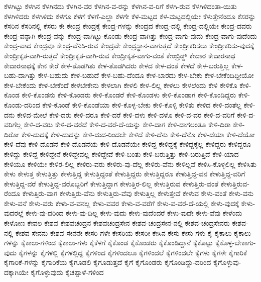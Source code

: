 {ಕೆಳಗಿಟ್ಟು
ಕೆಳಗಿನ
ಕೆಳಗಿನದು
ಕೆಳಗಿನ-ವರ
ಕೆಳಗಿನ-ವ-ರನ್ನು
ಕೆಳಗಿನ-ವ-ರಿಗೆ
ಕೆಳಗಿ-ರುವ
ಕೆಳಗಿಳಿದಂತಾ-ಯಿತು
ಕೆಳಗಿಳಿದರು
ಕೆಳಗಿಳಿದು
ಕೆಳಗೂ
ಕೆಳಗೆ
ಕೆಳಗೆ-ಎಲ್ಲಾ
ಕೆಳಗೇ
ಕೆಳ-ಮಟ್ಟದ
ಕೆಳ-ಮಟ್ಟದಲ್ಲಿಯೇ
ಕೆಳುತ್ತೇನೆಂದೂ
ಕೆಸರನ್ನು
ಕೆಸರಿನ
ಕೆಸರಿನಲ್ಲಿ
ಕೆಸರು
ಕೇ
ಕೇಂದ್ರ
ಕೇಂದ್ರಕ್ಕೆ
ಕೇಂದ್ರ-ಗಳನ್ನು
ಕೇಂದ್ರದ
ಕೇಂದ್ರ-ದಲ್ಲಿ
ಕೇಂದ್ರ-ದಲ್ಲಿಯೇ
ಕೇಂದ್ರ-ದವರು
ಕೇಂದ್ರ-ವನ್ನಾಗಿ
ಕೇಂದ್ರ-ವನ್ನು
ಕೇಂದ್ರ-ವಾಗಿಟ್ಟು-ಕೊಂಡು
ಕೇಂದ್ರ-ವಾಗಿತ್ತು
ಕೇಂದ್ರ-ವಾಗು-ವುದು
ಕೇಂದ್ರ-ವಾಗು-ವುದೆಂದು
ಕೇಂದ್ರ-ವಾದ
ಕೇಂದ್ರವೂ
ಕೇಂದ್ರ-ವೆನಿಸಿ-ರುವ
ಕೇಂದ್ರವೇ
ಕೇಂದ್ರಸ್ಥಾನ-ವಾಗುತ್ತದೆ
ಕೇಂದ್ರೀಕರಿಸಲು
ಕೇಂದ್ರೀಕರಿಸು-ವುದಕ್ಕೆ
ಕೇಂದ್ರೀಕೃತ-ವಾಗಿ-ರುತ್ತದೆ
ಕೇಂದ್ರೀಕೃತ-ವಾಗಿ-ರುವ
ಕೇಂದ್ರೀಕೃತ-ವಾಗು-ವಂತೆ
ಕೇಂಬ್ರಿಡ್ಜ್
ಕೇದಾರ
ಕೇದಾರನಾಥ
ಕೇದಾರನಾಥಕ್ಕೆ
ಕೇನ
ಕೇರೆ
ಕೇಳ-ತೊಡಗಿತು
ಕೇಳ-ತೊಡಗಿದರು
ಕೇಳದ
ಕೇಳ-ದಂತೆ
ಕೇಳದೆ
ಕೇಳ-ಬರುತ್ತಿಲ್ಲ
ಕೇಳ-ಬಹು-ದಾಗಿತ್ತು
ಕೇಳ-ಬಹುದು
ಕೇಳ-ಬಹುದೆ
ಕೇಳ-ಬಹು-ದೆಂದೂ
ಕೇಳ-ಬಾರದು
ಕೇಳ-ಬೇಕು
ಕೇಳ-ಬೇಕೆಂದಿದ್ದೀಯೋ
ಕೇಳ-ಬೇಕೆಂದು
ಕೇಳ-ಬೇಕೆಂದೆ
ಕೇಳಬೇಕೇನು
ಕೇಳಲಾಗಿ
ಕೇಳಲಿ
ಕೇಳ-ಲಿಲ್ಲ
ಕೇಳಲು
ಕೇಳಲೆಂದು
ಕೇಳಿ
ಕೇಳಿಕೊ
ಕೇಳಿ-ಕೊಂಡ
ಕೇಳಿ-ಕೊಂಡನು
ಕೇಳಿ-ಕೊಂಡರು
ಕೇಳಿ-ಕೊಂಡರೆ
ಕೇಳಿ-ಕೊಂಡಳು
ಕೇಳಿ-ಕೊಂಡಾಗ
ಕೇಳಿ-ಕೊಂಡಿದ್ದರು
ಕೇಳಿ-ಕೊಂಡು-ದರಿಂದ
ಕೇಳಿ-ಕೊಂಡೆ
ಕೇಳಿ-ಕೊಂಡೆಯಾ
ಕೇಳಿ-ಕೊಳ್ಳ-ಬೇಕು
ಕೇಳಿ-ಕೊಳ್ಳಿ
ಕೇಳಿತು
ಕೇಳಿದ
ಕೇಳಿ-ದಂತೆಲ್ಲ
ಕೇಳಿ-ದನು
ಕೇಳಿದ-ಮೇಲೆ
ಕೇಳಿ-ದರು
ಕೇಳಿ-ದರೂ
ಕೇಳಿ-ದರೆ
ಕೇಳಿ-ದಳು
ಕೇಳಿ-ದಳೊ
ಕೇಳಿ-ದ-ವರ
ಕೇಳಿ-ದ-ವರಿಗೆ
ಕೇಳಿ-ದ-ವರಿಗೆಲ್ಲ
ಕೇಳಿ-ದ-ವರು
ಕೇಳಿ-ದ-ವರೆದೆ
ಕೇಳಿ-ದ-ವರೆ-ದೆ-ಯನ್ನು
ಕೇಳಿ-ದಾಗ
ಕೇಳಿ-ದಾಗಲಂತೂ
ಕೇಳಿ-ದಿರಾ
ಕೇಳಿ-ದಿರೋ
ಕೇಳಿ-ದುದಕ್ಕೆ
ಕೇಳಿ-ದುದನ್ನು
ಕೇಳಿ-ದುದ-ರಿಂದಲೇ
ಕೇಳಿದೆ
ಕೇಳಿ-ದೆನು
ಕೇಳಿ-ದೆನೊ
ಕೇಳಿ-ದೆಯಾ
ಕೇಳಿ-ದೆಯೋ
ಕೇಳಿ-ದೆವು
ಕೇಳಿ-ದೊಡನೆ
ಕೇಳಿ-ದೊಡನೆಯೆ
ಕೇಳಿ-ದೊಡನೆಯೇ
ಕೇಳಿದ್ದ
ಕೇಳಿದ್ದಕ್ಕೆ
ಕೇಳಿದ್ದಕ್ಕೆಲ್ಲ
ಕೇಳಿದ್ದರು
ಕೇಳಿದ್ದರೂ
ಕೇಳಿದ್ದು
ಕೇಳಿದ್ದೆ
ಕೇಳಿದ್ದೇನೆ
ಕೇಳಿದ್ದೇವಲ್ಲ
ಕೇಳಿದ್ದೇವೆ
ಕೇಳಿ-ಬಂತು
ಕೇಳಿ-ಬರುತ್ತಿತ್ತು
ಕೇಳಿ-ಬರುತ್ತಿದೆ
ಕೇಳಿ-ಯಾದ
ಕೇಳಿಯೂ
ಕೇಳಿಯೇ
ಕೇಳಿರ-ಲಿಲ್ಲ
ಕೇಳಿರು-ವರು
ಕೇಳಿರು-ವು-ದೆಲ್ಲ
ಕೇಳಿರು-ವೆನು
ಕೇಳಿಲ್ಲವೆ
ಕೇಳಿಸಿ-ಕೊಳ್ಳಲಿಲ್ಲ
ಕೇಳಿಸಿತು
ಕೇಳು
ಕೇಳುತ್ತ
ಕೇಳುತ್ತಿತ್ತು
ಕೇಳುತ್ತಿದ್ದ
ಕೇಳುತ್ತಿದ್ದಂತೆ
ಕೇಳುತ್ತಿದ್ದರು
ಕೇಳುತ್ತಿದ್ದರೂ
ಕೇಳುತ್ತಿದ್ದ-ವನ
ಕೇಳುತ್ತಿದ್ದ-ವರಿಗೆ
ಕೇಳುತ್ತಿದ್ದ-ವರೆ
ಕೇಳುತ್ತಿದ್ದ-ವರೊಬ್ಬರಿಗೆ
ಕೇಳುತ್ತಿದ್ದಾಗ
ಕೇಳುತ್ತಿರ-ಲಿಲ್ಲ
ಕೇಳುತ್ತಿರುವ
ಕೇಳುತ್ತಿರು-ವಂತೆ
ಕೇಳುತ್ತಿರುವ-ರೆಂದೂ
ಕೇಳುತ್ತಿರು-ವಾಗ
ಕೇಳುತ್ತಿರು-ವೆನು
ಕೇಳುತ್ತಿರು-ವೆವು
ಕೇಳುತ್ತಿಲ್ಲ
ಕೇಳುತ್ತೇವೆ
ಕೇಳುವ
ಕೇಳು-ವಂತೆ
ಕೇಳು-ವನು
ಕೇಳು-ವನೆ
ಕೇಳು-ವರು
ಕೇಳು-ವ-ವನಲ್ಲ
ಕೇಳು-ವವರ
ಕೇಳು-ವ-ವರೆಗೆ
ಕೇಳು-ವ-ವರೆ-ದೆ-ಯಲ್ಲಿ
ಕೇಳು-ವುದಕ್ಕೆ
ಕೇಳು-ವುದರಲ್ಲೆ
ಕೇಳು-ವು-ದರಿಂದ
ಕೇಳು-ವು-ದಿಲ್ಲ
ಕೇಳು-ವುದು
ಕೇಳು-ವುದೆಂದರೆ
ಕೇಳು-ವುದೇ
ಕೇಳು-ವೆವು
ಕೇಳೆಂದು
ಕೇಳೋಣ
ಕೇವಲ
ಕೇಶವ
ಕೇಶವಚಂದ್ರನ
ಕೇಶವಚಂದ್ರಸೇನ
ಕೇಶವ-ಚಂದ್ರಸೇನ-ನಲ್ಲಿ
ಕೇಶವ-ಚಂದ್ರಸೇನರು
ಕೇಶವ-ನಲ್ಲಿ
ಕೇಶವ-ಸೇನನು
ಕೇಶವ-ಸೇನನೇ
ಕೇಸರಿ-ಗಳೇ
ಕೇಸರಿಯ
ಕೇಸರೀ
ಕೇಸಿನ
ಕೇಸು
ಕೇಸು-ಗಳು
ಕೈ
ಕೈಕಾಲು
ಕೈಕಾಲು-ಗಳನ್ನು
ಕೈಕಾಲು-ಗಳಿಂದ
ಕೈಕಾಲು-ಗಳು
ಕೈಕೆಳಗೆ
ಕೈಕೊಂಡ
ಕೈಕೊಂಡರು
ಕೈಕೊಂಡಿದ್ದಾನೆ
ಕೈಕೊಟ್ಟು
ಕೈಕೊಳ್ಳ-ಬೇಕಾಗು-ವುದು
ಕೈಗಳನ್ನು
ಕೈಗಳಲ್ಲಿ
ಕೈಗಳಲ್ಲಿದ್ದ
ಕೈಗಳಿಂದ
ಕೈಗಳಿಂದಲೂ
ಕೈಗಳಿಂದಲೆ
ಕೈಗಳಿಂದಲೇ
ಕೈಗಳು
ಕೈಗಳೇ
ಕೈಗಾರಿಕೆ
ಕೈಗಾರಿಕೆ-ಗಳನ್ನು
ಕೈಗಾರಿಕೆಯ
ಕೈಗೂಡಲಿ
ಕೈಗೂಡುತ್ತದೆ
ಕೈಗೆ
ಕೈಗೊಂಡರು
ಕೈಗೊಂಡಿದ್ದು-ದರಿಂದ
ಕೈಗೊಳ್ಳುವು-ದಕ್ಕಾಗಿಯೇ
ಕೈಗೊಳ್ಳುವುದು
ಕೈಚಪ್ಪಾಳೆ-ಗಳಿಂದ
}
